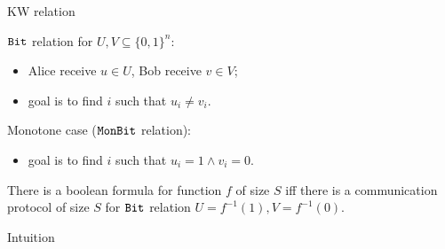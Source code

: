 \begin{frame}{KW relation}
    \begin{definition}
        $\mathtt{Bit}$ relation for $U, V \subseteq \{0, 1\}^{n}$:
        \begin{itemize}
            \item Alice receive $u \in U$, Bob receive $v \in V$;
            \item goal is to find $i$ such that $u_i \neq v_i$.
        \end{itemize}
    	\pause    
        Monotone case ($\mathtt{MonBit}$ relation):
        \begin{itemize}
            \item goal is to find $i$ such that $u_i = 1 \land v_i = 0$.
        \end{itemize}
    \end{definition}

    \pause

    \begin{theorem}
        There is a  boolean formula for function $f$ of size $S$ iff there is a communication
        protocol of size $S$ for $\mathtt{Bit}$  relation $U = f^{-1}(1), V = f^{-1}(0)$.
    \end{theorem}
\end{frame}

\begin{frame}{Intuition}


\end{frame}


